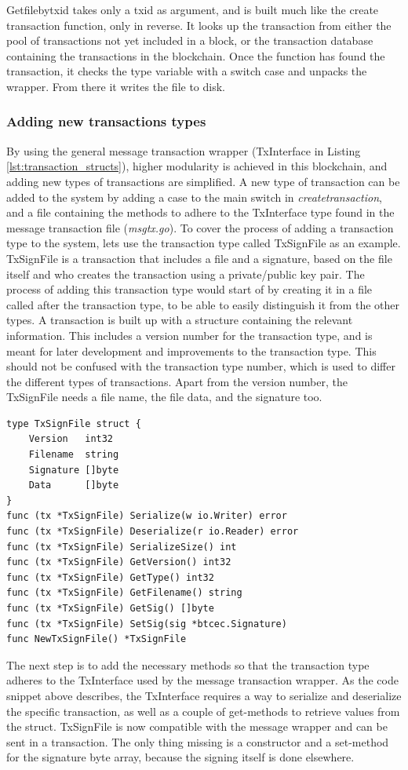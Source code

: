 \documentclass[12pt]{article}
\begin{document}
Getfilebytxid takes only a txid as argument, and is built much like the create transaction function, only in reverse. It looks up the transaction from either the pool of transactions not yet included in a block, or the transaction database containing the transactions in the blockchain. Once the function has found the transaction, it checks the type variable with a switch case and unpacks the wrapper. From there it writes the file to disk. 

\subsubsection{Adding new transactions types}
By using the general message transaction wrapper (TxInterface in Listing \ref{lst:transaction_structs}), higher modularity is achieved in this blockchain, and adding new types of transactions are simplified. A new type of transaction can be added to the system by adding a case to the main switch in  {\it{createtransaction}}, and a file containing the methods to adhere to the TxInterface type found in the message transaction file ({\it{msgtx.go}}). To cover the process of adding a transaction type to the system, lets use the transaction type called TxSignFile as an example. TxSignFile is a transaction that includes a file and a signature, based on the file itself and who creates the transaction using a private/public key pair. The process of adding this transaction type would start of by creating it in a file called after the transaction type, to be able to easily distinguish it from the other types. A transaction is built up with a structure containing the relevant information. This includes a version number for the transaction type, and is meant for later development and improvements to the transaction type. This should not be confused with the transaction type number, which is used to differ the different types of transactions. Apart from the version number, the TxSignFile needs a file name, the file data, and the signature too.
\begin{lstlisting}[float=h!,caption={TxSignFile},label=lst:txsign]
type TxSignFile struct {
	Version   int32
	Filename  string
	Signature []byte
	Data      []byte
}
func (tx *TxSignFile) Serialize(w io.Writer) error 
func (tx *TxSignFile) Deserialize(r io.Reader) error 
func (tx *TxSignFile) SerializeSize() int 
func (tx *TxSignFile) GetVersion() int32 
func (tx *TxSignFile) GetType() int32 
func (tx *TxSignFile) GetFilename() string 
func (tx *TxSignFile) GetSig() []byte
func (tx *TxSignFile) SetSig(sig *btcec.Signature)
func NewTxSignFile() *TxSignFile
\end{lstlisting}
The next step is to add the necessary methods so that the transaction type adheres to the TxInterface used by the message transaction wrapper. As the code snippet above describes, the TxInterface requires a way to serialize and deserialize the specific transaction, as well as a couple of get-methods to retrieve values from the struct. TxSignFile is now compatible with the message wrapper and can be sent in a transaction. The only thing missing is a constructor and a set-method for the signature byte array, because the signing itself is done elsewhere. 
\end{document}
